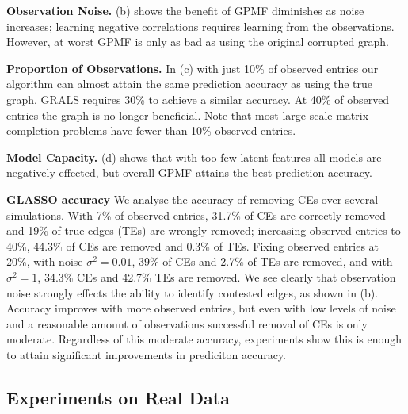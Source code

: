 \documentclass{article}
\theoremstyle{plain}
\theoremstyle{definition}
\theoremstyle{remark}
\begin{document}
\textbf{Observation Noise.} 
 (b)  shows the benefit of GPMF diminishes as noise increases; learning negative correlations requires learning from the observations. However, at worst GPMF is only as bad as using the original corrupted graph.

\textbf{Proportion of Observations.} 
In  (c)  with just 10\% of observed entries our algorithm can almost attain the same prediction accuracy as using the true graph. GRALS requires 30\% to achieve a similar accuracy. At 40\% of observed entries the graph is no longer beneficial. Note that most large scale matrix completion problems have fewer than 10\% observed entries.

\textbf{Model Capacity.}  (d)  shows that with too few latent features all models are negatively effected, but overall GPMF attains the best prediction accuracy.





\textbf{GLASSO accuracy} We analyse the accuracy of removing CEs over several simulations. With 7\% of observed entries, 31.7\% of CEs are correctly removed and 19\% of true edges (TEs) are wrongly removed; increasing observed entries to 40\%, 44.3\% of CEs are removed and 0.3\% of TEs. Fixing observed entries at 20\%, with noise $\sigma^2 = 0.01$, 39\% of CEs and 2.7\% of TEs are removed, and with $\sigma^2 = 1$, 34.3\% CEs and 42.7\% TEs are removed. We see clearly that observation noise strongly effects the ability to identify contested edges, as shown in  (b).  Accuracy improves with more observed entries, but even with low levels of noise and a reasonable amount of observations successful removal of CEs is only moderate. Regardless of this moderate accuracy, experiments show this is enough to attain significant improvements in prediciton accuracy.






\subsection{Experiments on Real Data}
\label{sec:real_data_experiments}
\end{document}
